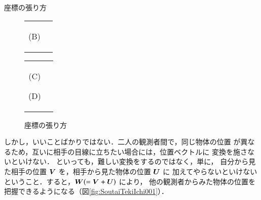 \begin{memo}{座標の張り方}
\begin{figure}[hbt]
\begin{tabular}{cc}
\begin{minipage}{0.45\hsize}
\begin{center}
                                (B)
                            \end{center}
                        \end{minipage}
                    \end{tabular}
                \end{figure}
                \begin{figure}[hbt]
                                        \centering
                    \begin{tabular}{cc}
                        \begin{minipage}{0.45\hsize}
                            \begin{center}
                                {ZahyouChokkouChokusen003.pdf}

                                (C)
                            \end{center}
                        \end{minipage}
                        \begin{minipage}{0.45\hsize}
                            \begin{center}
                                {ZahyouChokkouChokusen004.pdf}

                                (D)
                            \end{center}
                        \end{minipage}
                    \end{tabular}
                                \caption{座標の張り方}
                                \label{fig:ZahyouChokkouChokusen}
                \end{figure}

                しかし，いいことばかりではない．二人の観測者間で，同じ物体の位置
                が異なるため，互いに相手の目線に立ちたい場合には，位置ベクトルに
                変換を施さないといけない．
                といっても，難しい変換をするのではなく，単に，
                自分から見た相手の位置 $\boldsymbol{V}$ を，相手から見た物体の位置 $\boldsymbol{U}$ に
                加えてやらないといけないということ．すると，$\boldsymbol{W}(=\boldsymbol{V}+\boldsymbol{U})$ により，
                他の観測者からみた物体の位置を把握できるようになる（図\ref{fig:SoutaiTekiIchi001}）．


\end{memo}
